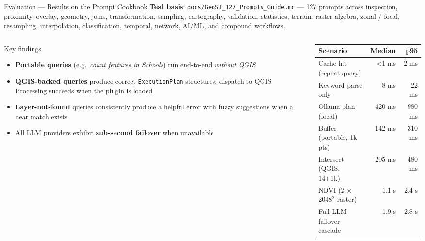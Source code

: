 \documentclass[aspectratio=169,11pt]{beamer}
\newcommand{\kw}[1]{{\color{geositeal}\bfseries #1}}
\begin{document}
\begin{frame}{Evaluation --- Results on the Prompt Cookbook}
  \small\textbf{Test basis}: \texttt{docs/GeoSI\_127\_Prompts\_Guide.md} --- 127 prompts across inspection, proximity, overlay, geometry, joins, transformation, sampling, cartography, validation, statistics, terrain, raster algebra, zonal / focal, resampling, interpolation, classification, temporal, network, AI/ML, and compound workflows.

  \vspace{0.3em}
  \begin{columns}[T,onlytextwidth]
    \begin{column}{0.5\textwidth}
      \begin{block}{Key findings}
        \begin{itemize}
          \item \kw{Portable queries} (e.g.\ \emph{count features in Schools}) run end-to-end \emph{without QGIS}
          \item \kw{QGIS-backed queries} produce correct \texttt{ExecutionPlan} structures; dispatch to QGIS Processing succeeds when the plugin is loaded
          \item \kw{Layer-not-found} queries consistently produce a helpful error with fuzzy suggestions when a near match exists
          \item All LLM providers exhibit \kw{sub-second failover} when unavailable
        \end{itemize}
      \end{block}
    \end{column}
    \begin{column}{0.5\textwidth}
      \footnotesize
      \begin{tabular}{@{}lrr@{}}
        \toprule
        \textbf{Scenario} & \textbf{Median} & \textbf{p95} \\ \midrule
        Cache hit (repeat query) & \textless 1 ms & 2 ms \\
        Keyword parse only & 8 ms & 22 ms \\
        Ollama plan (local) & 420 ms & 980 ms \\
        Buffer (portable, 1k pts) & 142 ms & 310 ms \\
        Intersect (QGIS, 14+1k) & 205 ms & 480 ms \\
        NDVI (2 $\times$ 2048$^{2}$ raster) & 1.1 s & 2.4 s \\
        Full LLM failover cascade & 1.9 s & 2.8 s \\
        \bottomrule
      \end{tabular}
      \vspace{0.3em}


\end{column}
\end{columns}
\end{frame}
\end{document}
